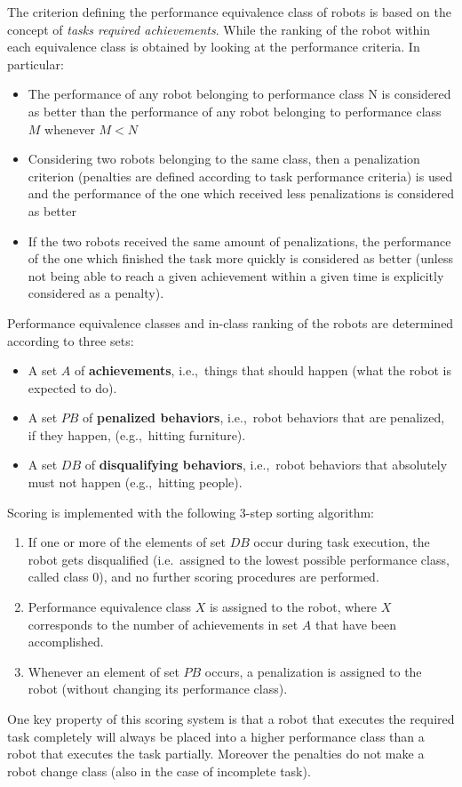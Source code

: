 \begin{description}
The criterion defining the performance equivalence class of robots is based on the concept of \emph{tasks required achievements}. While the ranking of the robot within each equivalence class is obtained by looking at the performance criteria. In particular:
%
\begin{itemize}
\item The performance of any robot belonging to performance class N is considered as better than the performance of any robot belonging to performance class $M$ whenever $M<N$
\item Considering two robots belonging to the same class, then a penalization criterion (penalties are defined according to task performance criteria) is used and the performance of the one which received less penalizations is considered as better
\item If the two robots received the same amount of penalizations, the performance of the one which finished the task more quickly is considered as better (unless not being able to reach a given achievement within a given time is explicitly considered as a penalty).
\end{itemize}
%
Performance equivalence classes and in-class ranking of the robots are determined according to three sets:
%
\begin{itemize}
\item A set $A$ of \textbf{achievements}, i.e.,~things that should happen (what the robot is expected to do).
\item A set $PB$ of \textbf{penalized behaviors}, i.e.,~robot behaviors that are penalized, if they happen, (e.g.,~hitting furniture).
\item A set $DB$ of \textbf{disqualifying behaviors}, i.e.,~robot behaviors that absolutely must not happen (e.g.,~hitting people).
\end{itemize}
%
Scoring is implemented with the following 3-step sorting algorithm:
%
\begin{enumerate}
\item If one or more of the elements of set $DB$ occur during task execution, the robot gets disqualified (i.e.~assigned to the lowest possible performance class, called class $0$), and no further scoring procedures are performed.
\item Performance equivalence class $X$ is assigned to the robot, where $X$ corresponds to the number of achievements in set $A$ that have been accomplished.
\item Whenever an element of set $PB$ occurs, a penalization is assigned to the robot (without changing its performance class).
\end{enumerate}
%
One key property of this scoring system is that a robot that executes the required task completely will always be placed into a higher performance class than a robot that executes the task partially. Moreover the penalties do not make a robot change class (also in the case of incomplete task).
%


\end{description}

